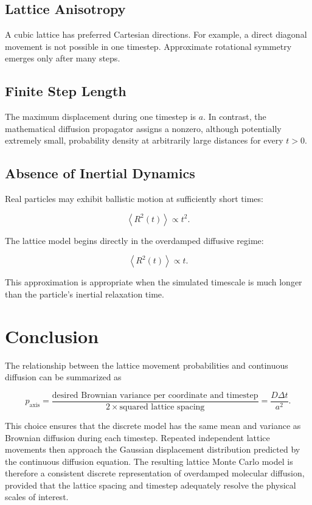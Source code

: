 \documentclass[11pt]{article}
\begin{document}
\subsection{Lattice Anisotropy}

A cubic lattice has preferred Cartesian directions. For example, a direct diagonal movement is not possible in one timestep. Approximate rotational symmetry emerges only after many steps.

\subsection{Finite Step Length}

The maximum displacement during one timestep is \(a\). In contrast, the mathematical diffusion propagator assigns a nonzero, although potentially extremely small, probability density at arbitrarily large distances for every \(t>0\).

\subsection{Absence of Inertial Dynamics}

Real particles may exhibit ballistic motion at sufficiently short times:

\begin{equation}
    \left\langle R^2(t)\right\rangle
    \propto
    t^2.
\end{equation}

The lattice model begins directly in the overdamped diffusive regime:

\begin{equation}
    \left\langle R^2(t)\right\rangle
    \propto
    t.
\end{equation}

This approximation is appropriate when the simulated timescale is much longer than the particle's inertial relaxation time.

\section{Conclusion}

The relationship between the lattice movement probabilities and continuous diffusion can be summarized as

\begin{equation}
    \boxed{
        p_{\mathrm{axis}}
        =
        \frac{
            \text{desired Brownian variance per coordinate and timestep}
        }{
            2\times\text{squared lattice spacing}
        }
        =
        \frac{D\Delta t}{a^2}
    }.
\end{equation}

This choice ensures that the discrete model has the same mean and variance as Brownian diffusion during each timestep. Repeated independent lattice movements then approach the Gaussian displacement distribution predicted by the continuous diffusion equation. The resulting lattice Monte Carlo model is therefore a consistent discrete representation of overdamped molecular diffusion, provided that the lattice spacing and timestep adequately resolve the physical scales of interest.
\end{document}
